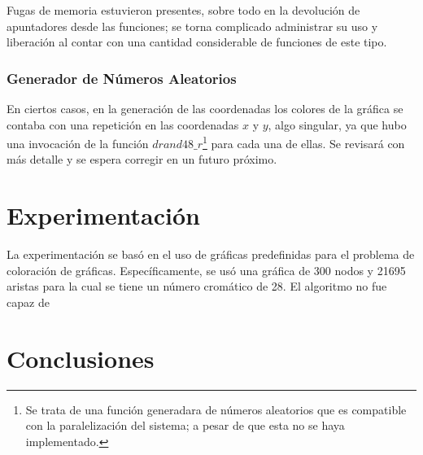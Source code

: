 \documentclass[a4paper]{report}
\begin{document}
Fugas de memoria estuvieron presentes, sobre todo en la devoluci\'on de apuntadores desde las
funciones; se torna complicado administrar su uso y liberaci\'on al contar con una cantidad
considerable de funciones de este tipo.

\subsection{Generador de N\'umeros Aleatorios}
En ciertos casos, en la generaci\'on de las coordenadas los colores de la gr\'afica
se contaba con una repetici\'on en las coordenadas $x$ y $y$, algo singular, ya que
hubo una invocaci\'on de la funci\'on $drand48\_r$\footnote{Se trata de una funci\'on
  generadara de n\'umeros aleatorios que es compatible con la paralelizaci\'on del sistema;
  a pesar de que esta no se haya implementado.} para cada una de ellas.
Se revisar\'a con m\'as detalle y se espera corregir en un futuro pr\'oximo.

\chapter{Experimentaci\'on}

La experimentaci\'on se bas\'o en el uso de gr\'aficas predefinidas para el problema
de coloraci\'on de gr\'aficas. Espec\'ificamente, se us\'o una gr\'afica de 300 nodos
y 21695 aristas para la cual se tiene un n\'umero crom\'atico de 28. El algoritmo
no fue capaz de

\chapter{Conclusiones}

{}

\end{document}
